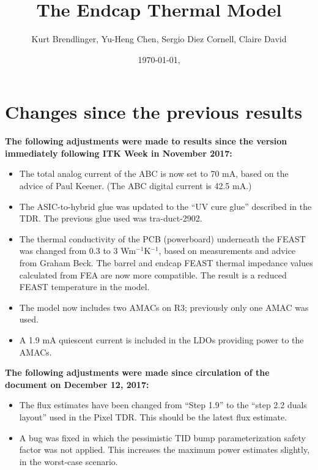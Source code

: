 \documentclass[10pt,]{article}
\title{The Endcap Thermal Model}
\date{\today, \currenttime}
\author{Kurt Brendlinger, Yu-Heng Chen, Sergio Diez Cornell, Claire David}
\begin{document}
\thispagestyle{empty}


\maketitle

\tableofcontents

\section{Changes since the previous results}

{ \bf
The following adjustments were made to results since the version immediately following ITK Week in
November 2017:}
\begin{itemize}
\item The total analog current of the ABC is now set to 70 mA, based on the advice of Paul Keener.
(The ABC digital current is 42.5 mA.)
\item The ASIC-to-hybrid glue was updated to the ``UV cure glue'' described in the TDR. The previous
  glue used was tra-duct-2902.
\item The thermal conductivity of the PCB (powerboard) underneath the FEAST was changed from 0.3 to
3 Wm$^{-1}$K$^{-1}$, based on measurements and advice from Graham Beck. The barrel and endcap FEAST
thermal impedance values calculated from FEA are now more compatible. The result is a reduced FEAST
temperature in the model.
\item The model now includes two AMACs on R3; previously only one AMAC was used.
\item A 1.9 mA quiescent current is included in the LDOs providing power to the AMACs.
\end{itemize}

{\bf 
The following adjustments were made since circulation of the document on December 12, 2017:}
\begin{itemize}
\item The flux estimates have been changed from ``Step 1.9'' to the ``step 2.2 duals layout'' used in
the Pixel TDR. This should be the latest flux estimate.
\item A bug was fixed in which the pessimistic TID bump parameterization safety factor was not applied.
This increases the maximum power estimates slightly, in the worst-case scenario.
\end{itemize}




\clearpage

\clearpage

\clearpage

\clearpage
\begin{appendices}

\end{appendices}
\end{document}
